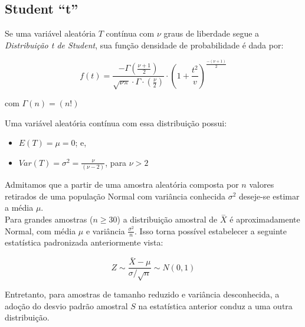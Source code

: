 \documentclass[
]{book}
\providecommand{\tightlist}{%
  \setlength{\itemsep}{0pt}\setlength{\parskip}{0pt}}
\begin{document}
\hfill\break

\hypertarget{student-t}{%
\subsection{Student ``t''}\label{student-t}}

\hfill\break

Se uma variável aleatória \(T\) contínua com \(\nu\) graus de liberdade segue a \textit{Distribuição t de Student}, sua função densidade de probabilidade é dada por:

\hfill\break

\[
f(t) =  \frac{-\Gamma \left(\frac{\nu +1}{2}\right)}{\sqrt{\nu \pi }\cdot \Gamma \cdot \left(\frac{\nu }{2}\right)}\cdot {\left(1+\frac{{t}^{2}}{v}\right)}^{\frac{-\left(\nu +1\right)}{2}}
\]

\hfill\break

com \(\Gamma (n) = (n!)\)

\hfill\break

Uma variável aleatória contínua com essa distribuição possui:

\hfill\break

\begin{itemize}
\tightlist
\item
  \(E(T)=\mu=0\); e,\\
\item
  \(Var(T)=\sigma^{2}=\frac{\nu}{(\nu -2)}\), para \(\nu > 2\)
\end{itemize}

\hfill\break

Admitamos que a partir de uma amostra aleatória composta por \(n\) valores retirados de uma população Normal com variância conhecida \(\sigma^{2}\) deseje-se estimar a média \(\mu\).\\

Para grandes amostras (\(n \ge 30\)) a distribuição amostral de \(\stackrel{-}{X}\) é aproximadamente Normal, com média \(\mu\) e variância \(\frac{\sigma^{2}}{n}\). Isso torna possível estabelecer a seguinte estatística padronizada anteriormente vista:

\[
Z \sim \frac{\bar X -\mu}{\sigma/\sqrt{n}} \sim N(0,1)
\]

\hfill\break

Entretanto, para amostras de tamanho reduzido e variância desconhecida, a adoção do desvio padrão amostral \(S\) na estatística anterior conduz a uma outra distribuição.

\hfill\break
\end{document}

